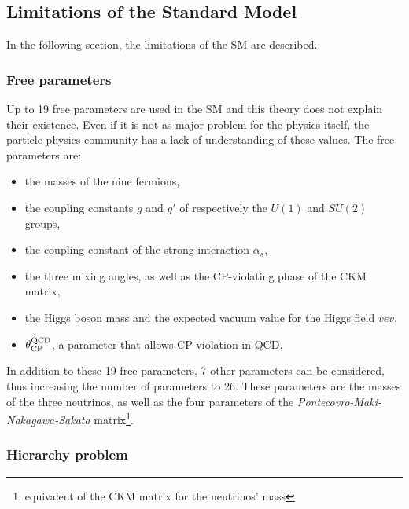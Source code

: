     \subsection{Limitations of the Standard Model}

    In the following section, the limitations of the \gls{SM} are described.


      \subsubsection{Free parameters}

      Up to 19 free parameters are used in the \gls{SM} and this theory does not explain their existence.
      Even if it is not as major problem for the physics itself, the particle physics community has a lack of understanding of these values.
      The free parameters are: 
      \begin{itemize}
        \item the masses of the nine fermions,
        \item the coupling constants $g$ and $g'$ of respectively the $U(1)$ and $SU(2)$ groups,
        \item the coupling constant of the strong interaction $\alpha_s$,
        \item the three mixing angles, as well as the CP-violating phase of the CKM matrix,
        \item the Higgs boson mass and the expected vacuum value for the Higgs field $vev$,
        \item $\theta^{\rm{QCD}}_{\rm{CP}}$, a parameter that allows CP violation in \gls{QCD}.
      \end{itemize}

      In addition to these 19 free parameters, 7 other parameters can be considered, thus increasing the number of parameters to 26.
      These parameters are the masses of the three neutrinos, as well as the four parameters of the \textit{Pontecovro-Maki-Nakagawa-Sakata} matrix\footnote{equivalent of the CKM matrix for the neutrinos' mass}.
    
      \subsubsection{Hierarchy problem}


